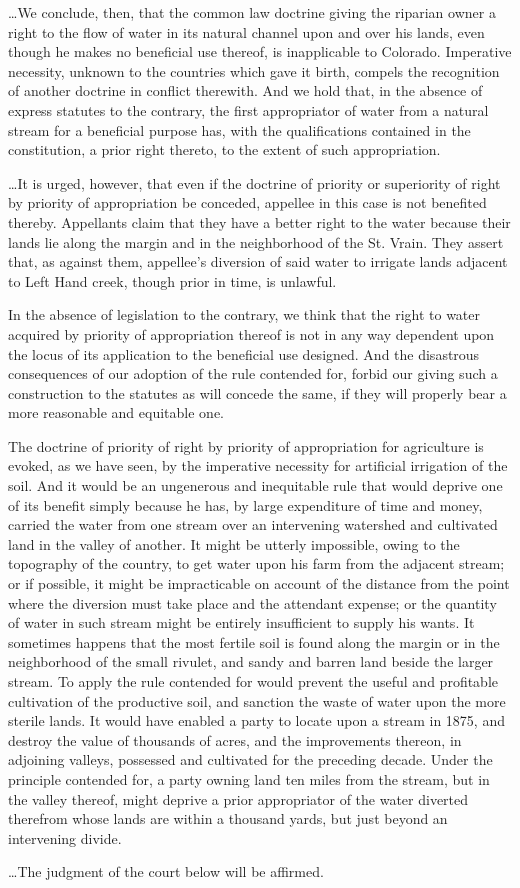 \ldots We conclude, then, that the common law doctrine giving the riparian owner
a right to the flow of water in its natural channel upon and over his lands,
even though he makes no beneficial use thereof, is inapplicable to Colorado.
Imperative necessity, unknown to the countries which gave it birth, compels the
recognition of another doctrine in conflict therewith. And we hold that, in the
absence of express statutes to the contrary, the first appropriator of water
from a natural stream for a beneficial purpose has, with the qualifications
contained in the constitution, a prior right thereto, to the extent of such
appropriation.

\ldots It is urged, however, that even if the doctrine of priority or
superiority of right by priority of appropriation be conceded, appellee in this
case is not benefited thereby. Appellants claim that they have a better right to
the water because their lands lie along the margin and in the neighborhood of
the St. Vrain. They assert that, as against them, appellee's diversion of said
water to irrigate lands adjacent to Left Hand creek, though prior in time, is
unlawful.

In the absence of legislation to the contrary, we think that the right to water
acquired by priority of appropriation thereof is not in any way dependent upon
the locus of its application to the beneficial use designed. And the disastrous
consequences of our adoption of the rule contended for, forbid our giving such a
construction to the statutes as will concede the same, if they will properly
bear a more reasonable and equitable one.

The doctrine of priority of right by priority of appropriation for agriculture
is evoked, as we have seen, by the imperative necessity for artificial
irrigation of the soil. And it would be an ungenerous and inequitable rule that
would deprive one of its benefit simply because he has, by large expenditure of
time and money, carried the water from one stream over an intervening watershed
and cultivated land in the valley of another. It might be utterly impossible,
owing to the topography of the country, to get water upon his farm from the
adjacent stream; or if possible, it might be impracticable on account of the
distance from the point where the diversion must take place and the attendant
expense; or the quantity of water in such stream might be entirely insufficient
to supply his wants. It sometimes happens that the most fertile soil is found
along the margin or in the neighborhood of the small rivulet, and sandy and
barren land beside the larger stream. To apply the rule contended for would
prevent the useful and profitable cultivation of the productive soil, and
sanction the waste of water upon the more sterile lands. It would have enabled a
party to locate upon a stream in 1875, and destroy the value of thousands of
acres, and the improvements thereon, in adjoining valleys, possessed and
cultivated for the preceding decade. Under the principle contended for, a party
owning land ten miles from the stream, but in the valley thereof, might deprive
a prior appropriator of the water diverted therefrom whose lands are within a
thousand yards, but just beyond an intervening divide.

\ldots The judgment of the court below will be affirmed.

